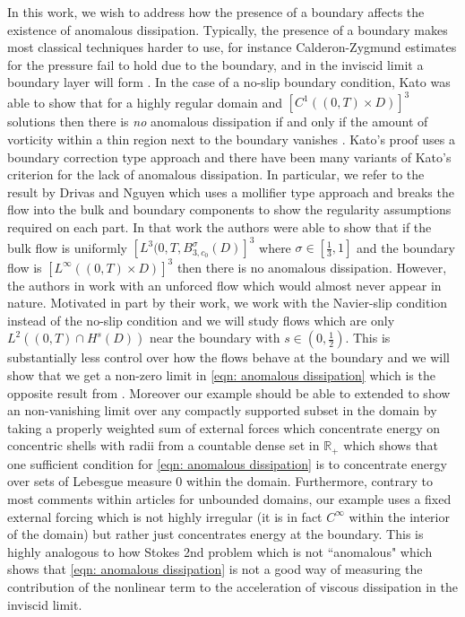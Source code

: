 \documentclass[11pt, reqno]{article}
\def\R{{\mathbb R}} %
\begin{document}
In this work, we wish to address how the presence of a boundary affects the existence of anomalous dissipation. Typically, the presence of a boundary makes most classical techniques harder to use, for instance Calderon-Zygmund estimates for the pressure fail to hold due to the boundary, and in the inviscid limit a boundary layer will form \cites{prandtl1928motion, sammartino1998zero1, kato1972nonstationary}. In the case of a no-slip boundary condition, Kato was able to show that for a highly regular domain and $[C^1((0,T) \times D)]^3$ solutions then there is \textit{no} anomalous dissipation if and only if the amount of vorticity within a thin region next to the boundary vanishes \cite{kato1972nonstationary}. Kato's proof uses a boundary correction type approach and there have been many variants of Kato's criterion for the lack of anomalous dissipation. In particular, we refer to the result by Drivas and Nguyen \cite{drivas2018onsager} which uses a mollifier type approach and breaks the flow into the bulk and boundary components to show the regularity assumptions required on each part. In that work the authors were able to show that if the bulk flow is uniformly $[L^3(0,T, B_{3, c_0}^\sigma(D)]^3$ where $\sigma \in [\frac{1}{3},1]$ and the boundary flow is $[L^\infty((0,T) \times D)]^3$ then there is no anomalous dissipation. However, the authors in \cite{drivas2018onsager} work with an unforced flow which would almost never appear in nature. Motivated in part by their work, we work with the Navier-slip condition instead of the no-slip condition and we will study flows which are only $L^2((0,T) \cap H^s(D))$ near the boundary with $s \in (0, \frac{1}{2})$. This is substantially less control over how the flows behave at the boundary and we will show that we get a non-zero limit in \eqref{eqn: anomalous dissipation} which is the opposite result from \cite{drivas2018onsager}. Moreover our example should be able to extended to show an non-vanishing limit over any compactly supported subset in the domain by taking a properly weighted sum of external forces which concentrate energy on concentric shells with radii from a countable dense set in $\R_+$ which shows that one sufficient condition for \eqref{eqn: anomalous dissipation} is to concentrate energy over sets of Lebesgue measure 0 within the domain. Furthermore, contrary to most comments within articles for unbounded domains, our example uses a fixed external forcing which is not highly irregular (it is in fact $C^\infty$ within the interior of the domain) but rather just concentrates energy at the boundary. This is highly analogous to how Stokes 2nd problem which is not ``anomalous" which shows that \eqref{eqn: anomalous dissipation} is not a good way of measuring the contribution of the nonlinear term to the acceleration of viscous dissipation in the inviscid limit.
\end{document}
